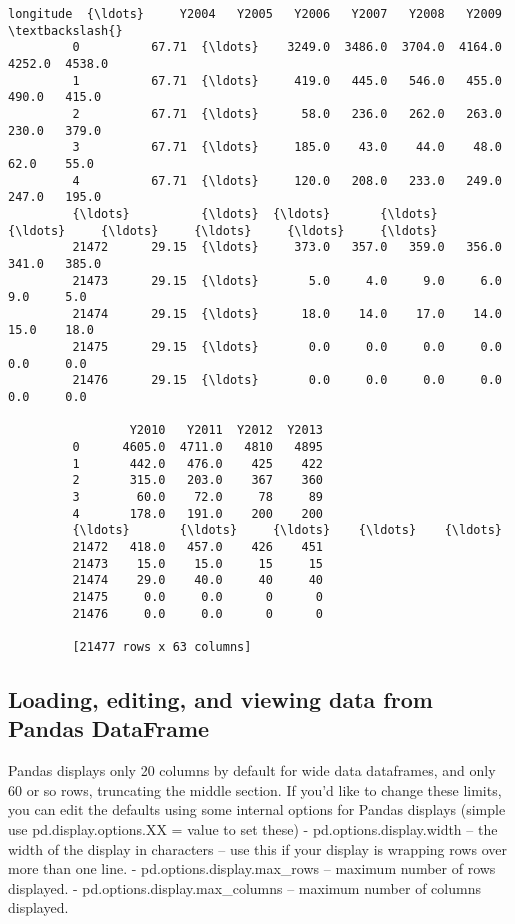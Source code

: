 \documentclass[11pt]{article}
\begin{document}
\begin{Verbatim}[commandchars=\\\{\}]
                longitude  {\ldots}     Y2004   Y2005   Y2006   Y2007   Y2008   Y2009  \textbackslash{}
         0          67.71  {\ldots}    3249.0  3486.0  3704.0  4164.0  4252.0  4538.0   
         1          67.71  {\ldots}     419.0   445.0   546.0   455.0   490.0   415.0   
         2          67.71  {\ldots}      58.0   236.0   262.0   263.0   230.0   379.0   
         3          67.71  {\ldots}     185.0    43.0    44.0    48.0    62.0    55.0   
         4          67.71  {\ldots}     120.0   208.0   233.0   249.0   247.0   195.0   
         {\ldots}          {\ldots}  {\ldots}       {\ldots}     {\ldots}     {\ldots}     {\ldots}     {\ldots}     {\ldots}   
         21472      29.15  {\ldots}     373.0   357.0   359.0   356.0   341.0   385.0   
         21473      29.15  {\ldots}       5.0     4.0     9.0     6.0     9.0     5.0   
         21474      29.15  {\ldots}      18.0    14.0    17.0    14.0    15.0    18.0   
         21475      29.15  {\ldots}       0.0     0.0     0.0     0.0     0.0     0.0   
         21476      29.15  {\ldots}       0.0     0.0     0.0     0.0     0.0     0.0   
         
                 Y2010   Y2011  Y2012  Y2013  
         0      4605.0  4711.0   4810   4895  
         1       442.0   476.0    425    422  
         2       315.0   203.0    367    360  
         3        60.0    72.0     78     89  
         4       178.0   191.0    200    200  
         {\ldots}       {\ldots}     {\ldots}    {\ldots}    {\ldots}  
         21472   418.0   457.0    426    451  
         21473    15.0    15.0     15     15  
         21474    29.0    40.0     40     40  
         21475     0.0     0.0      0      0  
         21476     0.0     0.0      0      0  
         
         [21477 rows x 63 columns]
\end{Verbatim}
            
    \subsection{Loading, editing, and viewing data from Pandas
DataFrame}\label{loading-editing-and-viewing-data-from-pandas-dataframe}

Pandas displays only 20 columns by default for wide data dataframes, and
only 60 or so rows, truncating the middle section. If you'd like to
change these limits, you can edit the defaults using some internal
options for Pandas displays (simple use pd.display.options.XX = value to
set these) - pd.options.display.width -- the width of the display in
characters -- use this if your display is wrapping rows over more than
one line. - pd.options.display.max\_rows -- maximum number of rows
displayed. - pd.options.display.max\_columns -- maximum number of
columns displayed.
\end{document}
